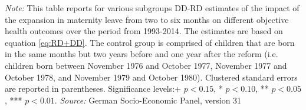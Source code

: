 \documentclass[a4paper ]{article}
\newlength\FHoffset
\begin{document}
	\setlength\FHoffset{-2.5cm} 
		\fancyheadoffset{\FHoffset}
\newpage
\begin{table}[htp] \centering
\def\sym#1{\ifmmode^{#1}\else\(^{#1}\)\fi}
\caption{Heterogenity Analysis for Objective Health Outcomes, DD-RD Estimates}\label{tab:Heterog_OH}
\begin{minipage}{0.98\textwidth} %
{\footnotesize \textit{Note:} This table reports for various subgroups DD-RD estimates of the impact of the expansion in maternity leave from two to six months on different objective health outcomes over the period from 1993-2014. The estimates are based on equation \ref{eq:RD+DD}. The control group is comprised of children that are born in the same months but two years before and one year after the reform (i.e. children born between November 1976 and October 1977, November 1977 and October 1978, and November 1979 and October 1980).\newline
Clustered standard errors are reported in parentheses. Significance levels:+ \(p<0.15\), * \(p<0.10\), ** \(p<0.05\), *** \(p<0.01\). \newline \textit{Source: }German Socio-Economic Panel, version 31\par}
\end{minipage}
\end{table}
\restoregeometry

\newpage
{}	
\setlength\FHoffset{-2.5cm} 
		\fancyheadoffset{\FHoffset}
\end{document}
